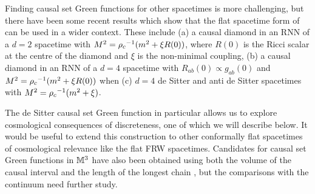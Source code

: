 Finding causal set Green functions for other spacetimes is more challenging, but there have been some recent results \citep{dsx}
which show that the flat spacetime form  of \cite{johnston, johnstonthesis} can be used in a wider context. These
include (a) a causal diamond in an RNN of a $d=2$ spacetime with $M^2={\rho_c}^{-1}({m^2+\xi R(0)})$, where $R(0)$  is the
Ricci scalar at the centre of the diamond and $\xi$ is the non-minimal
coupling,  (b)  a causal diamond in an RNN of a $d=4$ spacetime with $R_{ab}(0)
\propto g_{ab}(0)$ and  $M^2={\rho_c}^{-1}({m^2+\xi R(0)})$  when (c) $d=4$ de Sitter and anti de Sitter spacetimes with $M^2={\rho_c}^{-1}({m^2+\xi })$. 

The de Sitter causal set Green function in particular  allows us to  explore cosmological consequences  of  discreteness, one of which
we will describe below.  It would be useful to extend this construction to other conformally flat spacetimes of cosmological relevance like the flat FRW
spacetimes.  Candidates for causal set Green functions in $\mathbb M^3$ have also  been obtained using both the volume of the causal interval and the
length of the longest chain \citep{johnstonthesis,dsx}, but the comparisons with the continuum need
further study. 



